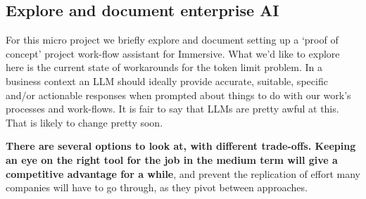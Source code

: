 %

\subsection{Explore and document enterprise AI}
For this micro project we briefly explore and document setting up a `proof of concept' project work-flow assistant for Immersive. What we'd like to explore here is the current state of workarounds for the token limit problem. In a business context an LLM should ideally provide accurate, suitable, specific and/or actionable responses when prompted about things to do with our work's processes and work-flows. It is fair to say that LLMs are pretty awful at this. That is likely to change pretty soon. \par
\textbf{There are several options to look at, with different trade-offs. Keeping an eye on the right tool for the job in the medium term will give a competitive advantage for a while}, and prevent the replication of effort many companies will have to go through, as they pivot between approaches.
